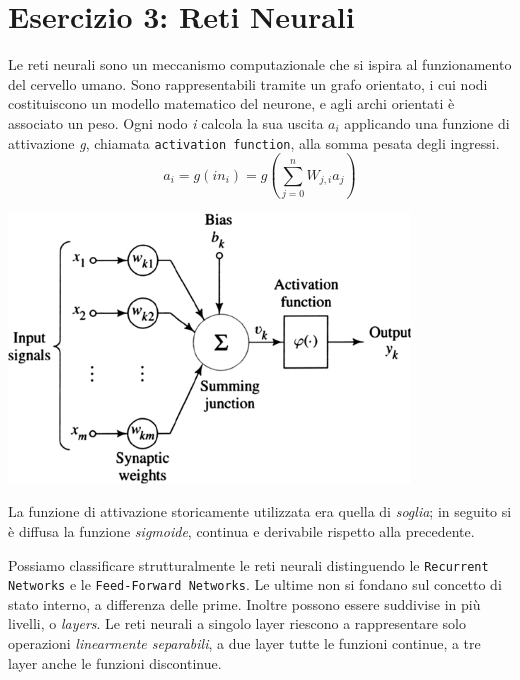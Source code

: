 		\section{Esercizio 3: Reti Neurali}
			\label{sec: es3}
			Le reti neurali sono un meccanismo computazionale che si ispira al funzionamento del cervello umano. Sono rappresentabili tramite un grafo orientato, i cui nodi costituiscono un modello matematico del neurone, e agli archi orientati è associato un peso. Ogni nodo \textit{i} calcola la sua uscita $a_{i}$ applicando una funzione di attivazione \textit{g}, chiamata \texttt{activation function}, alla somma pesata degli ingressi.%
			\begin{equation}
			a_{i} = g(in_{i}) =g( \sum_{j=0}^n W_{j,i} a_{j})
			\end{equation}
			\medskip
			\begin{center}
				\includegraphics[width=0.8\textwidth, height=0.3\textheight]{neurone.jpg}
			\end{center}
			La funzione di attivazione storicamente utilizzata era quella di \emph{soglia}; in seguito si è diffusa la funzione \emph{sigmoide}, continua e derivabile rispetto alla precedente.\par
			Possiamo classificare strutturalmente le reti neurali distinguendo le \texttt{Recurrent Networks} e le \texttt{Feed-Forward Networks}. Le ultime non si fondano sul concetto di stato interno, a differenza delle prime. Inoltre possono essere suddivise in più livelli, o \emph{layers}. Le reti neurali a singolo layer riescono a rappresentare solo operazioni \emph{linearmente separabili}, a due layer tutte le funzioni continue, a tre layer anche le funzioni discontinue.
